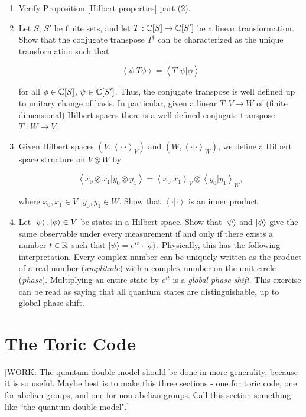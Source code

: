 \documentclass{article}
\theoremstyle{definition}
\numberwithin{figure}{section}
\begin{document}
\begin{enumerate}[\thesection .1.]

\item Verify Proposition \ref{Hilbert properties} part (2).

\item Let $S$, $S'$ be finite sets, and let $T: \mathbb{C}[S]\to \mathbb{C}[S']$ be a linear transformation. Show that the conjugate transpose $T^{\dagger}$ can be characterized as the unique transformation such that

$$\left<\psi | T \phi \right>=\left< T^{\dagger} \psi | \phi \right>$$

for all $\phi\in \mathbb{C}[S]$, $\psi\in \mathbb{C}[S']$. Thus, the conjugate transpose is well defined up to unitary change of basis. In particular, given a linear $T:V\to W$ of (finite dimensional) Hilbert spaces there is a well defined conjugate transpose $T^{\dagger}:W\to V$.

\item Given Hilbert spaces $(V,\left<\cdot|\cdot\right>_V)$ and $(W,\left<\cdot|\cdot\right>_W)$, we define a Hilbert space structure on $V\otimes W$ by

$$\left<x_0\otimes x_1| y_0\otimes y_1\right>=\left<x_0|x_1\right>_{V}\otimes \left<y_0|y_1\right>_W,$$

where $x_0,x_1\in V$, $y_0,y_1\in W$. Show that $\left<\cdot| \cdot\right>$ is an inner product.

\item Let $\left|\psi\right>,\left|\phi\right>\in V$ be states in a Hilbert space. Show that $\left|\psi\right>$ and $\left|\phi\right>$ give the same observable under every measurement if and only if there exists a number $t\in \mathbb{R}$ such that $\left|\psi\right> = e^{i t}\cdot \left|\phi\right>$. Physically, this has the following interpretation. Every complex number can be uniquely written as the product of a real number (\textit{amplitude}) with a complex number on the unit circle (\textit{phase}). Multiplying an entire state by $e^{i t}$ is a \textit{global phase shift}. This exercise can be read as saying that all quantum states are distinguishable, up to global phase shift.
\end{enumerate}

\section{The Toric Code}
\label{The Toric Code}

[WORK: The quantum double model should be done in more generality, because it is so useful. Maybe best is to make this three sections - one for toric code, one for abelian groups, and one for non-abelian groups. Call this section something like ``the quantum double model".]
\end{document}
